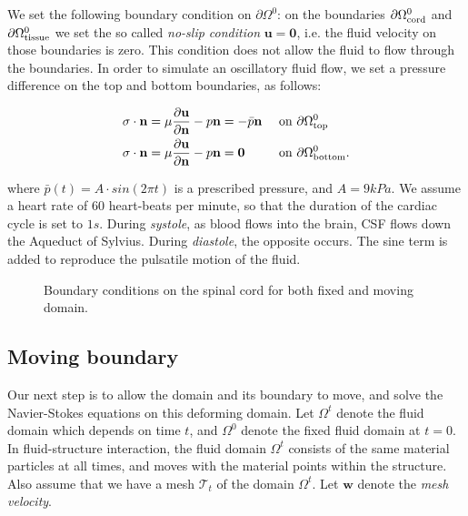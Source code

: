 \documentclass[a4paper,11pt,openright,twoside]{book}
\newcommand{\mesh}{\mathcal{T}_t}
\begin{document}
We set the following boundary condition on $\partial \Omega^0$: on the boundaries $\partial \Omega_{\rm cord}^0$ and $\partial \Omega_{\rm tissue}^0$ we set the so called \emph{no-slip condition} $\mathbf{u = 0}$, i.e. the fluid velocity on those boundaries is zero. This condition does not allow the fluid to flow through the boundaries.
In order to simulate an oscillatory fluid flow, we set a pressure difference on the top and bottom boundaries, as follows:

\begin{align}
\label{eq:bc:6}
\sigma \cdot \mathbf{n} &= \mu \frac{\partial \mathbf{u}}{\partial \mathbf{n}} - p \mathbf{n} = -\bar{p} \mathbf{n} && \text { on } \partial \Omega_{\rm top}^0 \\
\label{eq:bc:6bis}
\sigma \cdot \mathbf{n} &= \mu \frac{\partial \mathbf{u}}{\partial \mathbf{n}} - p \mathbf{n} = \mathbf{0}  && \text { on } \partial \Omega_{\rm bottom}^0.
\end{align}

where $\bar{p}(t) = A \cdot sin(2\pi t)$ is a prescribed pressure, and $A = 9kPa$. We assume a heart rate of $60$ heart-beats per minute, so that the duration of the cardiac cycle is set to $1s$. During \textit{systole}, as blood flows into the brain, CSF flows down the Aqueduct of Sylvius. During \textit{diastole}, the opposite occurs. The sine term is added to reproduce the pulsatile motion of the fluid. 

\begin{figure}[h!]
\centering
{}
\caption{Boundary conditions on the spinal cord for both fixed and moving domain.}
\label{img:cns:4}
\end{figure}


\newpage


\subsection{Moving boundary}
Our next step is to allow the domain and its boundary to move, and
solve the Navier-Stokes equations on this deforming domain. Let $\Omega^t$ denote the fluid domain which depends on time $t$, and
$\Omega^0$ denote the fixed fluid domain at $t = 0$. In
fluid-structure interaction, the fluid domain $\Omega^t$ consists of
the same material particles at all times, and moves with the material
points within the structure. Also assume that we have a mesh $\mesh$
of the domain $\Omega^t$. Let $\mathbf{w}$ denote the \emph{mesh velocity}.
  
\end{document}
